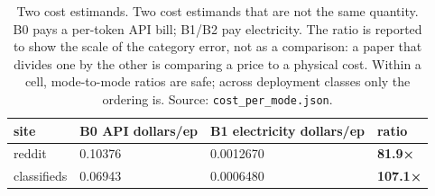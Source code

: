 \begin{table}[tp]
\centering
\caption{Two cost estimands. Two cost estimands that are not the same quantity. B0 pays a per-token API bill; B1/B2 pay electricity. The ratio is reported to show the scale of the category error, not as a comparison: a paper that divides one by the other is comparing a price to a physical cost. Within a cell, mode-to-mode ratios are safe; across deployment classes only the ordering is. Source: \texttt{cost\_per\_mode.json}.}
\label{tab:t36}
\footnotesize
\setlength{\tabcolsep}{3pt}
\begin{tabular}{@{}llll@{}}
\toprule
site & B0 API dollars/ep & B1 electricity dollars/ep & ratio \\
\midrule
reddit & 0.10376 & 0.0012670 & \textbf{81.9×} \\
classifieds & 0.06943 & 0.0006480 & \textbf{107.1×} \\
\bottomrule
\end{tabular}
\end{table}
